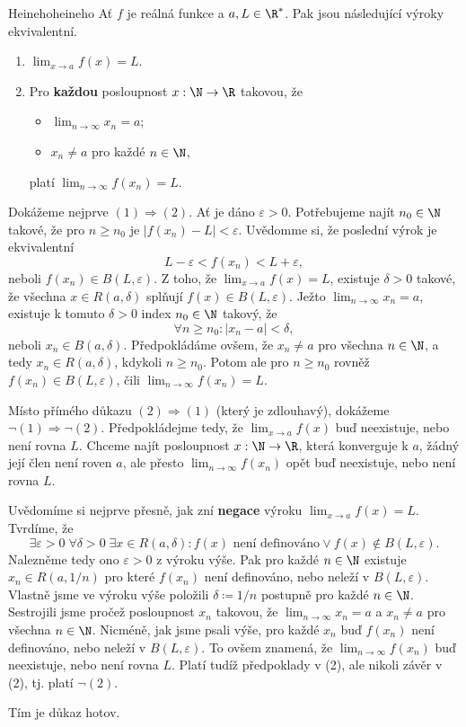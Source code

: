 \begin{theorem}{Heineho}{heineho}
 Ať $f$ je reálná funkce a $a,L \in \R^{*}$. Pak jsou následující výroky
 ekvivalentní.
 \begin{enumerate}
  \item $\lim_{x \to a} f(x) = L$.
  \item Pro \textbf{každou} posloupnost $x:\N \to \R$ takovou, že
  \begin{itemize}
   \item $\lim_{n \to \infty} x_n = a$;
   \item $x_n \neq a$ pro každé $n \in \N$,
  \end{itemize}
  platí $\lim_{n \to \infty} f(x_n) = L$.
 \end{enumerate}
\end{theorem}
\begin{thmproof}
 Dokážeme nejprve $(1) \Rightarrow (2)$. Ať je dáno $\varepsilon>0$. Potřebujeme
 najít $n_0 \in \N$ takové, že pro $n \geq n_0$ je $|f(x_n) - L|<\varepsilon$.
 Uvědomme si, že poslední výrok je ekvivalentní
 \[
  L -\varepsilon< f(x_n)<L+\varepsilon,
 \]
 neboli $f(x_n) \in B(L,\varepsilon)$. Z toho, že $\lim_{x \to a} f(x) = L$,
 existuje $\delta>0$ takové, že všechna $x \in R(a,\delta)$ splňují $f(x) \in
 B(L,\varepsilon)$. Ježto $\lim_{n \to \infty} x_n = a$, existuje k tomuto
 $\delta>0$ index $n_0 \in \N$ takový, že
 \[
 \forall n \geq n_0: |x_n-a|<\delta,
 \]
 neboli $x_n \in B(a,\delta)$. Předpokládáme ovšem, že $x_n \neq a$ pro všechna
 $n \in \N$, a tedy $x_n \in R(a,\delta)$, kdykoli $n \geq n_0$. Potom ale pro
 $n \geq n_0$ rovněž $f(x_n) \in B(L,\varepsilon)$, čili $\lim_{n \to \infty}
 f(x_n) = L$.

 Místo přímého důkazu $(2) \Rightarrow (1)$ (který je zdlouhavý), dokážeme $\neg
 (1) \Rightarrow \neg (2)$. Předpokládejme tedy, že $\lim_{x \to a} f(x)$ buď
 neexistuje, nebo není rovna $L$. Chceme najít posloupnost $x:\N \to \R$, která
 konverguje k $a$, žádný její člen není roven $a$, ale přesto $\lim_{n \to
 \infty} f(x_n)$ opět buď neexistuje, nebo není rovna $L$.

 Uvědomíme si nejprve přesně, jak zní \textbf{negace} výroku $\lim_{x \to a}
 f(x) = L$. Tvrdíme, že
 \[
 \exists \varepsilon>0 \; \forall \delta>0 \; \exists x \in R(a,\delta): f(x)
 \text{ není definováno} \vee f(x) \notin B(L,\varepsilon).
 \]
 Nalezněme tedy ono $\varepsilon>0$ z výroku výše. Pak pro každé $n \in \N$
 existuje $x_n \in R(a,1 / n)$ pro které $f(x_n)$ není definováno, nebo neleží v
 $B(L,\varepsilon)$. Vlastně jsme ve výroku výše položili $\delta \coloneqq 1 /
 n$ postupně pro každé $n \in \N$. Sestrojili jsme pročež posloupnost $x_n$
 takovou, že $\lim_{n \to \infty} x_n = a$ a $x_n \neq a$ pro všechna $n \in
 \N$. Nicméně, jak jsme psali výše, pro každé $x_n$ buď $f(x_n)$ není
 definováno, nebo neleží v $B(L,\varepsilon)$. To ovšem znamená, že $\lim_{n \to
 \infty} f(x_n)$ buď neexistuje, nebo není rovna $L$. Platí tudíž předpoklady v
 (2), ale nikoli závěr v (2), tj. platí $\neg (2)$.

 Tím je důkaz hotov.
\end{thmproof}

